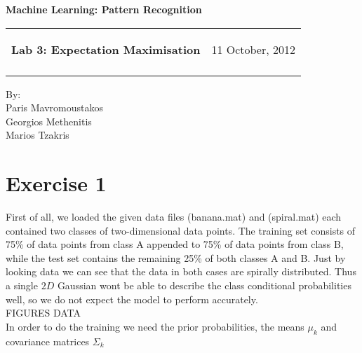 \documentclass[letterpaper,11pt]{article}
\newcommand{\resheading}[1]{{\LARGE \colorbox{mygrey}{\begin{minipage}{\textwidth}{\textbf{#1 \vphantom{p\^{E}}}}\end{minipage}}}}
\begin{document}
\begin{center}
{\Large \textbf{Machine Learning: Pattern Recognition}}\\ [1em]
\end{center}
\newcommand{\mywebheader}{
    \begin{tabular}{@{}p{5.3in}p{4in}}
		{\resheading{{\LARGE Lab 3: Expectation Maximisation}}} & { {\Large 11 October, 2012}}\\\vspace{0.3cm}
	    \end{tabular}}
    \mywebheader
    
    	\begin{center}
    	{\Large By:} \\ \vspace{0.1cm}
	    {\Large Paris Mavromoustakos} \\  \vspace{0.1cm}
	    {\Large Georgios Methenitis} \\ \vspace{0.1cm}
	    {\Large Marios Tzakris}
	    \end{center}

  
  \section*{Exercise 1}

First of all, we loaded the given data files (banana.mat) and (spiral.mat) each contained two classes of two-dimensional data points. The training set consists of 75\% of data points from class A appended to 75\% of data points from class B, while the test set contains the remaining
25\% of both classes A and B. Just by looking data we can see that the data in both cases are spirally distributed. Thus a single $2D$ Gaussian wont be able to describe the class conditional probabilities well, so we do not expect the model to perform accurately.\\

FIGURES DATA
\\

In order to do the training we need the prior probabilities, the means $\mu_k$ and covariance matrices $\Sigma_k$




    

    
\end{document}
